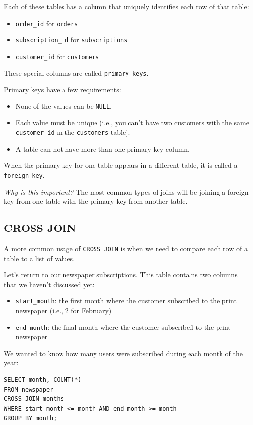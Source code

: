 \documentclass[a4paper, 12pt]{article}
\begin{document}
Each of these tables has a column that uniquely identifies each row of that table:
\begin{itemize}
\item \verb|order_id| for \verb|orders|

\item \verb|subscription_id| for \verb|subscriptions|

\item \verb|customer_id| for \verb|customers|

\end{itemize}
These special columns are called \verb|primary keys|.

Primary keys have a few requirements:
\begin{itemize}
\item None of the values can be \verb|NULL|.

\item Each value must be unique (i.e., you can't have two customers with the same \verb|customer_id| in the \verb|customers| table).

\item A table can not have more than one primary key column.

\end{itemize}

When the primary key for one table appears in a different table, it is called a \verb|foreign key|.

\textit{Why is this important?} The most common types of joins will be joining a foreign key from one table with the primary key from another table.

\subsection{CROSS JOIN}
A more common usage of \verb|CROSS JOIN| is when we need to compare each row of a table to a list of values.

Let's return to our newspaper subscriptions. This table contains two columns that we haven't discussed yet:
\begin{itemize}
\item \verb|start_month|: the first month where the customer subscribed to the print newspaper (i.e., 2 for February)

\item \verb|end_month|: the final month where the customer subscribed to the print newspaper

\end{itemize}
We wanted to know how many users were subscribed during each month of the year:
\begin{verbatim}
SELECT month, COUNT(*)
FROM newspaper
CROSS JOIN months
WHERE start_month <= month AND end_month >= month
GROUP BY month;
\end{verbatim}
\end{document}
